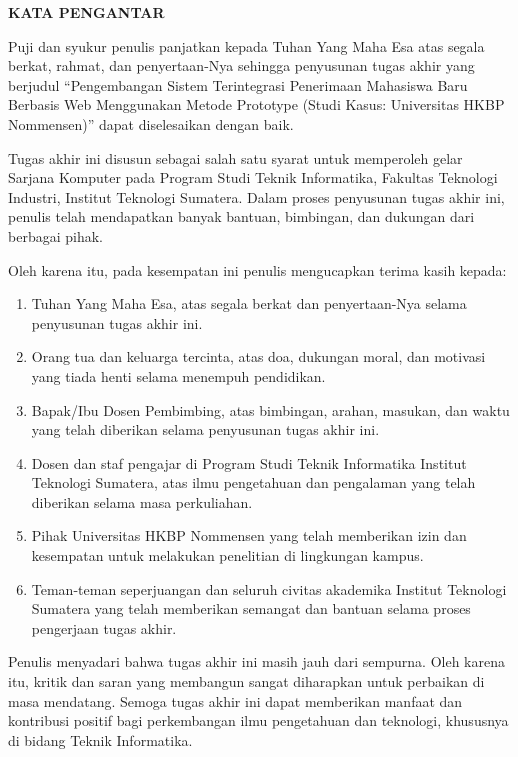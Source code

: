 \clearpage
{}%

\begin{justifying}
	\large \bfseries \centering \MakeUppercase{Kata Pengantar}\linebreak
	
	\normalsize \normalfont \justifying
	Puji dan syukur penulis panjatkan kepada Tuhan Yang Maha Esa atas segala berkat, rahmat, dan penyertaan-Nya sehingga penyusunan tugas akhir yang berjudul ``Pengembangan Sistem Terintegrasi Penerimaan Mahasiswa Baru Berbasis Web Menggunakan Metode Prototype (Studi Kasus: Universitas HKBP Nommensen)'' dapat diselesaikan dengan baik. \par
	Tugas akhir ini disusun sebagai salah satu syarat untuk memperoleh gelar Sarjana Komputer pada Program Studi Teknik Informatika, Fakultas Teknologi Industri, Institut Teknologi Sumatera. Dalam proses penyusunan tugas akhir ini, penulis telah mendapatkan banyak bantuan, bimbingan, dan dukungan dari berbagai pihak. \par
	Oleh karena itu, pada kesempatan ini penulis mengucapkan terima kasih kepada: \par
	\begin{enumerate}
		\item Tuhan Yang Maha Esa, atas segala berkat dan penyertaan-Nya selama penyusunan tugas akhir ini.
		\item Orang tua dan keluarga tercinta, atas doa, dukungan moral, dan motivasi yang tiada henti selama menempuh pendidikan.
		\item Bapak/Ibu Dosen Pembimbing, atas bimbingan, arahan, masukan, dan waktu yang telah diberikan selama penyusunan tugas akhir ini.
		\item Dosen dan staf pengajar di Program Studi Teknik Informatika Institut Teknologi Sumatera, atas ilmu pengetahuan dan pengalaman yang telah diberikan selama masa perkuliahan.
		\item Pihak Universitas HKBP Nommensen yang telah memberikan izin dan kesempatan untuk melakukan penelitian di lingkungan kampus.
		\item Teman-teman seperjuangan dan seluruh civitas akademika Institut Teknologi Sumatera yang telah memberikan semangat dan bantuan selama proses pengerjaan tugas akhir.
	\end{enumerate} \par
	Penulis menyadari bahwa tugas akhir ini masih jauh dari sempurna. Oleh karena itu, kritik dan saran yang membangun sangat diharapkan untuk perbaikan di masa mendatang. Semoga tugas akhir ini dapat memberikan manfaat dan kontribusi positif bagi perkembangan ilmu pengetahuan dan teknologi, khususnya di bidang Teknik Informatika.
	\vfill
	
\end{justifying}
\clearpage
